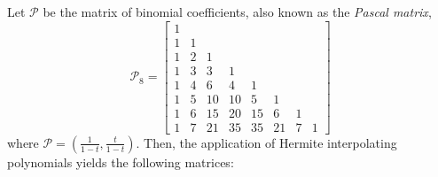 
\begin{example}
Let $\mathcal{P}$ be the matrix of binomial coefficients, also known as the
\textit{Pascal matrix},
\begin{displaymath}
\mathcal{P}_{8}=\left[\begin{matrix}1 &   &   &   &   &   &   &  \\1 & 1 &   &   &   &   &   &  \\1 & 2 & 1 &   &   &   &   &  \\1 & 3 & 3 & 1 &   &   &   &  \\1 & 4 & 6 & 4 & 1 &   &   &  \\1 & 5 & 10 & 10 & 5 & 1 &   &  \\1 & 6 & 15 & 20 & 15 & 6 & 1 &  \\1 & 7 & 21 & 35 & 35 & 21 & 7 & 1\end{matrix}\right]
\end{displaymath}
where $\displaystyle\mathcal{P} = \left(\frac{1}{1-t}, \frac{t}{1-t} \right)$.
Then, the application of Hermite interpolating polynomials yields the following matrices:
\begin{displaymath}

\end{displaymath}
\end{example}
